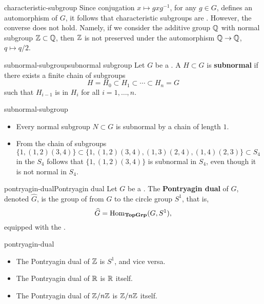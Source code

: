 \begin{example}{characteristic-subgroup}
    Since conjugation $x \mapsto gxg^{-1}$, for any $g \in G$, defines an automorphism of $G$, it follows that characteristic subgroups are . However, the converse does not hold. Namely, if we consider the additive group $\mathbb{Q}$ with normal subgroup $\mathbb{Z} \subset \mathbb{Q}$, then $\mathbb{Z}$ is not preserved under the automorphism $\mathbb{Q} \to \mathbb{Q}$, $q \mapsto q/2$.
\end{example}

\begin{topic}{subnormal-subgroup}{subnormal subgroup}
    Let $G$ be a . A  $H \subset G$ is \textbf{subnormal} if there exists a finite chain of subgroups
    \[ H = H_0 \subset H_1 \subset \cdots \subset H_n = G \]
    such that $H_{i - 1}$ is  in $H_i$ for all $i = 1, \ldots, n$.
\end{topic}

\begin{example}{subnormal-subgroup}
    \begin{itemize}
        \item Every normal subgroup $N \subset G$ is subnormal by a chain of length $1$.
        \item From the chain of subgroups $\{ 1, (1, 2) (3, 4) \} \subset \{ 1, (1, 2) (3, 4), (1, 3) (2, 4), (1, 4) (2, 3) \} \subset S_4$ in the  $S_4$ follows that $\{ 1, (1, 2)(3, 4) \}$ is subnormal in $S_4$, even though it is not normal in $S_4$.
    \end{itemize}
\end{example}

\begin{topic}{pontryagin-dual}{Pontryagin dual}
    Let $G$ be a   . The \textbf{Pontryagin dual} of $G$, denoted $\widehat{G}$, is the group of   from $G$ to the circle group $S^1$, that is,
    \[ \widehat{G} = \operatorname{Hom}_\textbf{TopGrp}(G, S^1) , \]
    equipped with the .
\end{topic}

\begin{example}{pontryagin-dual}
    \begin{itemize}
        \item The Pontryagin dual of $\mathbb{Z}$ is $S^1$, and vice versa.
        \item The Pontryagin dual of $\mathbb{R}$ is $\mathbb{R}$ itself.
        \item The Pontryagin dual of $\mathbb{Z}/n\mathbb{Z}$ is $\mathbb{Z}/n\mathbb{Z}$ itself.
    \end{itemize}
\end{example}

